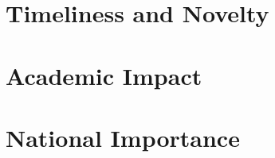 \documentclass[12pt, twocolumn]{article}
\begin{document}
\section{Timeliness and Novelty}
    

\section{Academic Impact}
    

\section{National Importance}
    



\end{document}
